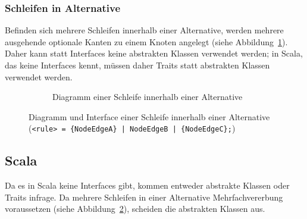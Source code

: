 \documentclass[../InterneDSLs.tex]{subfiles}
\begin{document}
\subsubsection{Schleifen in Alternative}
Befinden sich mehrere Schleifen innerhalb einer Alternative, werden mehrere ausgehende optionale Kanten zu einem Knoten angelegt (siehe Abbildung~\ref{FIG:DiagramLoopsInAlternative}). Daher kann statt Interfaces keine abstrakten Klassen verwendet werden; in Scala, das keine Interfaces kennt, müssen daher Traits statt abstrakten Klassen verwendet werden.
\begin{figure}[ht]
\centering
  \begin{subfigure}[c]{0.49\textwidth}
    \caption{Diagramm einer Schleife innerhalb einer Alternative}
    \label{FIG:DiagramLoopsInAlternative}
  \end{subfigure}
  \begin{subfigure}[c]{0.49\textwidth}
    
  \end{subfigure}
  \caption{Diagramm und Interface einer Schleife innerhalb einer Alternative (\texttt{<rule> = \{NodeEdgeA\} | NodeEdgeB | \{NodeEdgeC\};})}
  \label{FIG:LoopsInAlternative}
\end{figure}

\subsection{Scala}
Da es in Scala keine Interfaces gibt, kommen entweder abstrakte Klassen oder Traits infrage. Da mehrere Schleifen in einer Alternative Mehrfachvererbung voraussetzen (siehe Abbildung~\ref{FIG:LoopsInAlternative}), scheiden die abstrakten Klassen aus.
\end{document}
